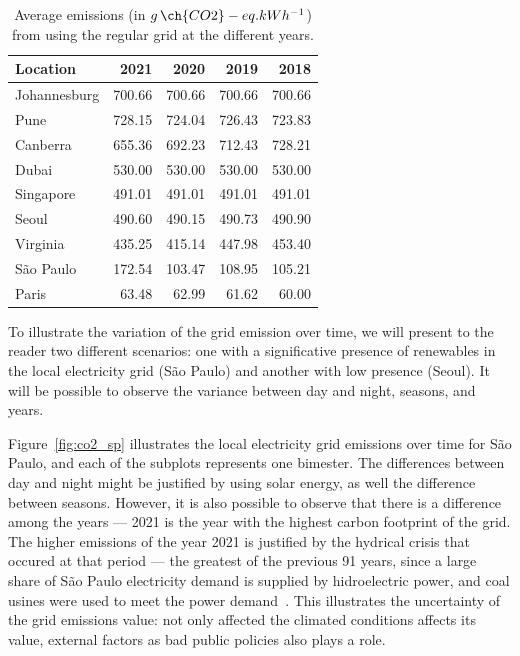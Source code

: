 \begin{table}[h]
  \caption{Average emissions (in $g\,\ch{CO2}-eq.kWh^{-1}$) from using the regular grid at the different years.}\label{tab:grid_emissions_avg_year} \centering
  \begin{tabular}{|l|r|r|r|r|}    
  \hline   
  \textbf{Location} &  \textbf{2021} & \textbf{2020} & \textbf{2019} & \textbf{2018}\\
  \hline
  Johannesburg & 700.66 & 700.66 & 700.66 & 700.66  \\
  \hline
  Pune & 728.15 & 724.04 & 726.43 & 723.83     \\
  \hline
  Canberra & 655.36 & 692.23 & 712.43 & 728.21\\
  \hline
  Dubai & 530.00  & 530.00 & 530.00 & 530.00     \\
  \hline
  Singapore & 491.01 & 491.01 & 491.01 & 491.01 \\
  \hline     
  Seoul & 490.60 & 490.15 & 490.73 & 490.90     \\
  \hline
  Virginia  & 435.25 & 415.14 & 447.98 & 453.40 \\
  \hline
  São Paulo &  172.54 &  103.47 & 108.95 &  105.21 \\
  \hline 
  Paris &  63.48  & 62.99 & 61.62   & 60.00   \\
  \hline

\end{tabular}  
\end{table}



To illustrate the variation of the grid emission over time, we will present to the reader two different scenarios: one with a significative presence of renewables in the local electricity grid (São Paulo) and another with low presence (Seoul). It will be possible to observe the variance between day and night, seasons, and years.



Figure~\ref{fig:co2_sp} illustrates the local electricity grid emissions over time for São Paulo, and each of the subplots represents one bimester. The differences between day and night might be justified by using solar energy, as well the difference between seasons. However, it is also possible to observe that there is a difference among the years --- 2021 is the year with the highest carbon footprint of the grid. The higher emissions of the year 2021 is justified by the hydrical crisis that occured at that period --- the greatest of the previous 91 years, since a large share of São Paulo electricity demand is supplied by hidroelectric power, and coal usines were used to meet the power demand~\cite{CNN2021_crisehidrica}. This illustrates the uncertainty of the grid emissions value: not only affected the climated conditions affects its value, external factors as bad public policies also plays a role.

